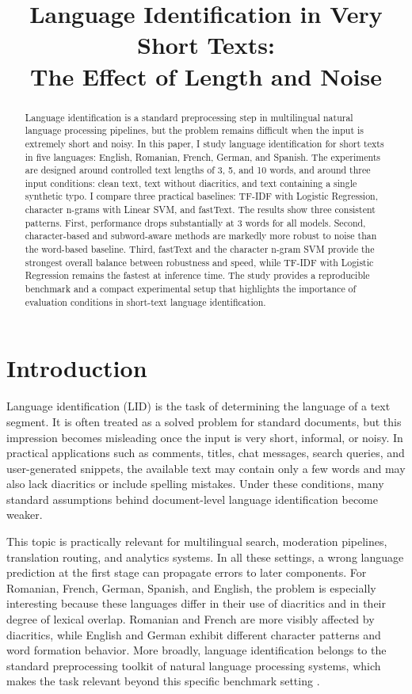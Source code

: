 \documentclass[conference]{IEEEtran}
\title{Language Identification in Very Short Texts:\\
The Effect of Length and Noise}
\author{
\IEEEauthorblockN{Andrei-Cosmin Achim}
\IEEEauthorblockA{
Transilvania University of Brasov\\
Email: cosmin.achim@student.unitbv.ro
}
}
\date{}
\begin{document}
\maketitle
\begin{abstract}
Language identification is a standard preprocessing step in multilingual natural language processing pipelines, but the problem remains difficult when the input is extremely short and noisy. In this paper, I study language identification for short texts in five languages: English, Romanian, French, German, and Spanish. The experiments are designed around controlled text lengths of 3, 5, and 10 words, and around three input conditions: clean text, text without diacritics, and text containing a single synthetic typo. I compare three practical baselines: TF-IDF with Logistic Regression, character n-grams with Linear SVM, and fastText. The results show three consistent patterns. First, performance drops substantially at 3 words for all models. Second, character-based and subword-aware methods are markedly more robust to noise than the word-based baseline. Third, fastText and the character n-gram SVM provide the strongest overall balance between robustness and speed, while TF-IDF with Logistic Regression remains the fastest at inference time. The study provides a reproducible benchmark and a compact experimental setup that highlights the importance of evaluation conditions in short-text language identification.
\end{abstract}

\section{Introduction}

Language identification (LID) is the task of determining the language of a text segment. It is often treated as a solved problem for standard documents, but this impression becomes misleading once the input is very short, informal, or noisy. In practical applications such as comments, titles, chat messages, search queries, and user-generated snippets, the available text may contain only a few words and may also lack diacritics or include spelling mistakes. Under these conditions, many standard assumptions behind document-level language identification become weaker.

This topic is practically relevant for multilingual search, moderation pipelines, translation routing, and analytics systems. In all these settings, a wrong language prediction at the first stage can propagate errors to later components. For Romanian, French, German, Spanish, and English, the problem is especially interesting because these languages differ in their use of diacritics and in their degree of lexical overlap. Romanian and French are more visibly affected by diacritics, while English and German exhibit different character patterns and word formation behavior. More broadly, language identification belongs to the standard preprocessing toolkit of natural language processing systems, which makes the task relevant beyond this specific benchmark setting \cite{jurafsky2025slp}.
\end{document}
